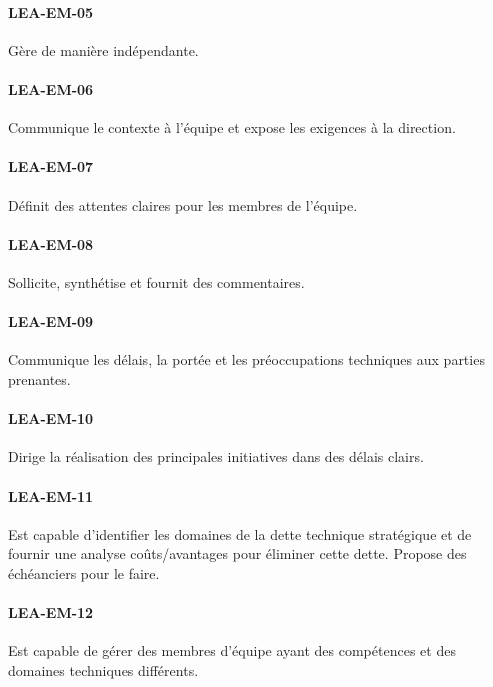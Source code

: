 \documentclass[a4paper, french, openany, 12pt]{book}
\newcommand\cha[1]{\textcolor{OliveGreen}{\textbf{\uppercase{lea-{#1}}}}}
\begin{document}
\begin{multicols}{2}
  \paragraph*{\cha{em-05}}

  Gère de manière indépendante.

  \paragraph*{\cha{em-06}}

  Communique le contexte à l'équipe et expose les exigences à la direction.

  \paragraph*{\cha{em-07}}

  Définit des attentes claires pour les membres de l'équipe.

  \paragraph*{\cha{em-08}}

  Sollicite, synthétise et fournit des commentaires.

  \paragraph*{\cha{em-09}}

  Communique les délais, la portée et les préoccupations techniques aux parties prenantes.

  \paragraph*{\cha{em-10}}

  Dirige la réalisation des principales initiatives dans des délais clairs.

  \paragraph*{\cha{em-11}}

  Est capable d'identifier les domaines de la dette technique stratégique et de fournir une analyse coûts/avantages pour
  éliminer cette dette.
  Propose des échéanciers pour le faire.

  \paragraph*{\cha{em-12}}

  Est capable de gérer des membres d'équipe ayant des compétences et des domaines techniques différents.

\end{multicols}
\end{document}
